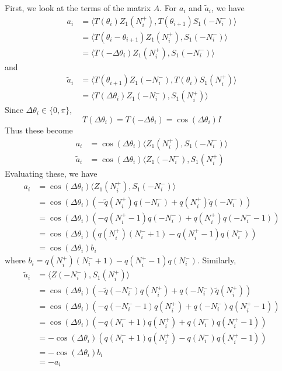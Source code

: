 \documentclass[12pt]{article}
\begin{document}
First, we look at the terms of the matrix $A$. For $a_i$ and $\tilde{a}_i$, we have
\begin{align*}
a_i &= \langle T(\theta_i) Z_1(N_i^+), T(\theta_{i+1}) S_1(-N_i^-) \rangle \\
&= \langle T(\theta_i - \theta_{i+1}) Z_1(N_i^+), S_1(-N_i^-) \rangle \\
&= \langle T(-\Delta\theta_i)Z_1(N_i^+), S_1(-N_i^-) \rangle
\end{align*}
and
\begin{align*}
\tilde{a}_i &= \langle T(\theta_{i+1}) Z_1(-N_i^-), T(\theta_i) S_1(N_i^+) \rangle \\
&= \langle T(\Delta \theta_i) Z_1(-N_i^-), S_1(N_i^+) \rangle
\end{align*}
Since $\Delta\theta_i \in \{0, \pi\}$, 
\[
T(\Delta\theta_i) = T(-\Delta\theta_i) = \cos(\Delta\theta_i)I
\]
Thus these become
\begin{align*}
a_i &= \cos(\Delta\theta_i) \langle Z_1(N_i^+), S_1(-N_i^-) \rangle \\
\tilde{a}_i &= \cos(\Delta\theta_i) \langle Z_1(-N_i^-), S_1(N_i^+) 
\end{align*}
Evaluating these, we have
\begin{align*}
a_i &= \cos(\Delta\theta_i)\langle Z_1(N_i^+), S_1(-N_i^-) \rangle \\
&= \cos(\Delta\theta_i)(-\tilde{q}(N_i^+)q(-N_i^-) + q(N_i^+)\tilde{q}(-N_i^-)) \\
&= \cos(\Delta\theta_i)(-q(N_i^+ - 1)q(-N_i^-) + q(N_i^+)q(-N_i^- - 1) )\\
&= \cos(\Delta\theta_i)( q(N_i^+)(N_i^- + 1) - q(N_i^+ - 1)q(N_i^-) )\\
&= \cos(\Delta\theta_i) b_i
\end{align*}
where $b_i = q(N_i^+)(N_i^- + 1) - q(N_i^+ - 1)q(N_i^-)$. Similarly,
\begin{align*}
\tilde{a}_i &= \langle Z(-N_i^-), S_1(N_i^+) \rangle \\
&= \cos(\Delta\theta_i)(-\tilde{q}(-N_i^-)q(N_i^+) + q(-N_i^-)\tilde{q}(N_i^+)) \\
&= \cos(\Delta\theta_i)(-q(-N_i^- - 1)q(N_i^+) + q(-N_i^-)q(N_i^+ - 1)) \\
&= \cos(\Delta\theta_i)(-q(N_i^- + 1)q(N_i^+) + q(N_i^-)q(N_i^+ - 1)) \\
&= -\cos(\Delta\theta_i)(q(N_i^- + 1)q(N_i^+) - q(N_i^-)q(N_i^+ - 1)) \\
&= -\cos(\Delta\theta_i) b_i \\
&= -a_i
\end{align*}
\end{document}
